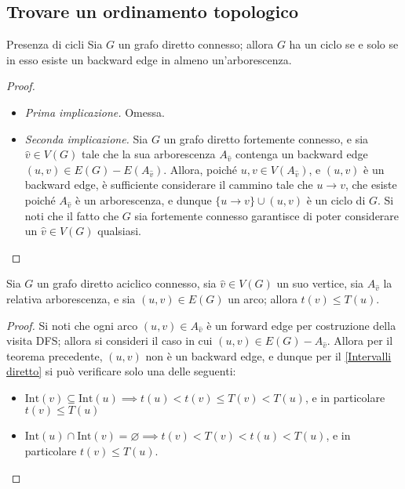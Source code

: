 \documentclass[a4paper, 12pt]{report}
\begin{document}
    \subsection{Trovare un ordinamento topologico}

    \begin{framedthm}{Presenza di cicli}
        \label{Cicli diretto}
        Sia $G$ un grafo diretto connesso; allora $G$ ha un ciclo se e solo se in esso esiste un backward edge in almeno un'arborescenza.
    \end{framedthm}

    \begin{proof}
        \hspace{0.7cm}
        \begin{itemize}
            \item[] \textit{Prima implicazione.} Omessa.
            \item[] \textit{Seconda implicazione.} Sia $G$ un grafo diretto fortemente connesso, e sia $\hat v \in V(G)$ tale che la sua arborescenza $A_{\hat v}$ contenga un backward edge $(u, v) \in E(G) - E(A_{\hat v})$. Allora, poiché $u, v \in V(A_{\hat v})$, e $(u, v)$ è un backward edge, è sufficiente considerare il cammino tale che $u \rightarrow v$, che esiste poiché $A_{\hat v}$ è un arborescenza, e dunque $\{u \rightarrow v\} \cup (u, v)$ è un ciclo di $G$. Si noti che il fatto che $G$ sia fortemente connesso garantisce di poter considerare un $\hat v \in V(G)$ qualsiasi.
        \end{itemize}
    \end{proof}

    \begin{framedcor}{}
        Sia $G$ un grafo diretto aciclico connesso, sia $\hat v \in V(G)$ un suo vertice, sia $A_{\hat v}$ la relativa arborescenza, e sia $(u, v) \in E(G)$ un arco; allora $t(v) \le T(u)$.
    \end{framedcor}

    \begin{proof}
        Si noti che ogni arco $(u, v) \in A_{\hat v}$ è un forward edge per costruzione della visita DFS; allora si consideri il caso in cui $(u, v) \in E(G) - A_{\hat v}$. Allora per il teorema precedente, $(u, v)$ non è un backward edge, e dunque per il \cref{Intervalli diretto} si può verificare solo una delle seguenti:
        \begin{itemize}
            \item $\mathrm{Int}(v) \subseteq \mathrm{Int}(u) \implies t(u) < t(v) \le T(v) < T(u)$, e in particolare $t(v) \le T(u)$
            \item $\mathrm{Int}(u) \cap \mathrm{Int}(v) = \varnothing \implies t(v) < T(v) < t(u) < T(u)$, e in particolare $t(v) \le T(u)$.
        \end{itemize}
    \end{proof}
\end{document}
